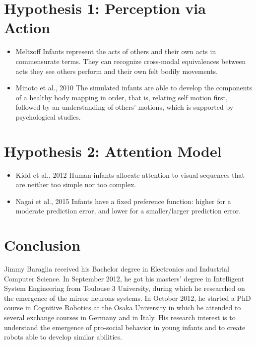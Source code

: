 \documentclass[journal]{IEEEtran}
\begin{document}
\section{Hypothesis 1: Perception via Action} 
\begin{itemize}
\item Meltzoff \cite{meltzoff2007like} Infants represent the acts of others and their own acts in commensurate terms. They can recognize cross-modal equivalences between acts they see others perform and their own felt bodily movements. 
\item Minoto et al., 2010 \cite{Minato2012} The simulated infants are able to develop the components of a healthy body mapping in order, that is, relating self motion first, followed by an understanding of others’ motions, which is supported by psychological studies.
\end{itemize}

\section{Hypothesis 2: Attention Model}

\begin{itemize}
\item Kidd et al., 2012 \cite{Kidd2012} Human infants allocate attention to visual sequences that are neither too simple nor too complex.
\item Nagai et al., 2015 \cite{nagai2015model} Infants have a fixed preference function: higher for a moderate prediction error, and lower for a smaller/larger prediction error.
\end{itemize}

\section{Conclusion}




\begin{IEEEbiography}{Jimmy Baraglia}
received his Bachelor degree in Electronics and Industrial Computer Science. In September 2012, he got his masters' degree in Intelligent System Engineering from Toulouse 3 University, during which he researched on the emergence of the mirror neurons systems. In October 2012, he started a PhD course in Cognitive Robotics at the Osaka University in which he attended to several exchange courses in Germany and in Italy. His research interest is to understand the emergence of pro-social behavior in young infants and to create robots able to develop similar abilities.
\end{IEEEbiography}
\end{document}

